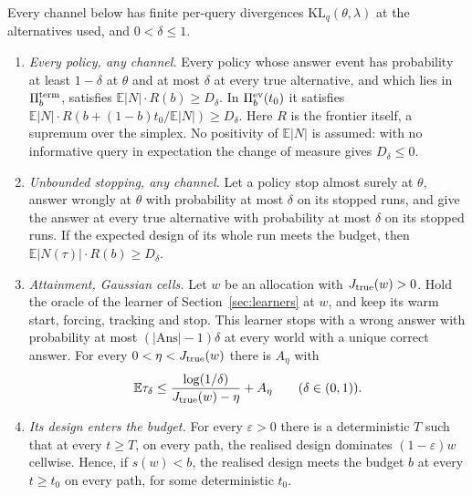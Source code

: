\begin{theorem}
\label{thm:repairlaw}
Every channel below has finite per-query divergences $\mathrm{KL}_q(\theta,\lambda)$ at the
alternatives used, and $0<\delta\le1$.
\begin{enumerate}
\item[(i)] \emph{Every policy, any channel.} Every policy whose answer event has probability at
least $1-\delta$ at $\theta$ and at most $\delta$ at every true alternative, and which lies in
$\Pi_b^{\rm term}$, satisfies $\mathbb E|N|\cdot R(b)\ge D_\delta$. In $\Pi_b^{\rm ev}(t_0)$ it
satisfies $\mathbb E|N|\cdot R(b+(1-b)t_0/\mathbb E|N|)\ge D_\delta$. Here $R$ is the frontier
itself, a supremum over the simplex. No positivity of $\mathbb E|N|$ is assumed: with no
informative query in expectation the change of measure gives $D_\delta\le0$.
\item[(ii)] \emph{Unbounded stopping, any channel.} Let a policy stop almost surely at $\theta$,
answer wrongly at $\theta$ with probability at most $\delta$ on its stopped runs, and give the
answer at every true alternative with probability at most $\delta$ on its stopped runs. If the
expected design of its whole run meets the budget, then $\mathbb E|N(\tau)|\cdot R(b)\ge D_\delta$.
\item[(iii)] \emph{Attainment, Gaussian cells.} Let $w$ be an allocation with
$J_{\rm true}(w)>0$. Hold the oracle of the learner of Section~\ref{sec:learners} at $w$, and
keep its warm start, forcing, tracking and stop. This learner stops with a wrong answer with
probability at most $(|\mathrm{Ans}|-1)\delta$ at every world with a unique correct answer. For
every
$0<\eta<J_{\rm true}(w)$ there is $A_\eta$ with
\[
\mathbb E\tau_\delta\le\frac{\log(1/\delta)}{J_{\rm true}(w)-\eta}+A_\eta
\qquad(\delta\in(0,1)).
\]
\item[(iv)] \emph{Its design enters the budget.} For every $\varepsilon>0$ there is a
deterministic $T$ such that at every $t\ge T$, on every path, the realised design dominates
$(1-\varepsilon)w$ cellwise. Hence, if $s(w)<b$, the realised design meets the budget $b$ at
every $t\ge t_0$ on every path, for some deterministic $t_0$.
\end{enumerate}
\end{theorem}

